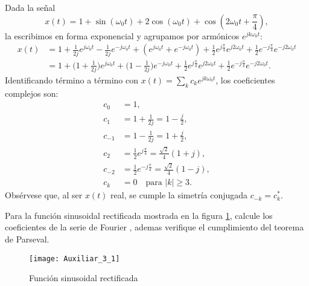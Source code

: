 \documentclass[
  11pt,
  letterpaper,
   addpoints,
   answers
  ]{exam}
\begin{document}
\begin{questions}
\begin{solution}
Dada la señal
\begin{equation}
x(t)=1+\sin(\omega_0 t)+2\cos(\omega_0 t)+\cos\!\left(2\omega_0 t+\frac{\pi}{4}\right),
\end{equation}
la escribimos en forma exponencial y agrupamos por armónicos \(e^{jk\omega_0 t}\):
\begin{align}
x(t)
&= 1
+ \frac{1}{2j}e^{j\omega_0 t}-\frac{1}{2j}e^{-j\omega_0 t}
+ \left(e^{j\omega_0 t}+e^{-j\omega_0 t}\right)
+ \frac{1}{2}e^{j\frac{\pi}{4}}e^{j2\omega_0 t}
+ \frac{1}{2}e^{-j\frac{\pi}{4}}e^{-j2\omega_0 t} \\
&= 1
+ \Big(1+\tfrac{1}{2j}\Big)e^{j\omega_0 t}
+ \Big(1-\tfrac{1}{2j}\Big)e^{-j\omega_0 t}
+ \frac{1}{2}e^{j\frac{\pi}{4}}e^{j2\omega_0 t}
+ \frac{1}{2}e^{-j\frac{\pi}{4}}e^{-j2\omega_0 t}.
\end{align}
Identificando término a término con \(x(t)=\sum_k c_k e^{jk\omega_0 t}\), los coeficientes complejos son:
\begin{align}
c_0 &= 1, \\
c_{1} &= 1+\frac{1}{2j}=1-\frac{j}{2}, \\
c_{-1} &= 1-\frac{1}{2j}=1+\frac{j}{2}, \\
c_{2} &= \frac{1}{2}e^{j\frac{\pi}{4}}=\frac{\sqrt{2}}{4}(1+j), \\
c_{-2} &= \frac{1}{2}e^{-j\frac{\pi}{4}}=\frac{\sqrt{2}}{4}(1-j), \\
c_k &= 0 \quad \text{para } |k|\ge 3.
\end{align}
Obsérvese que, al ser \(x(t)\) real, se cumple la simetría conjugada \(c_{-k}=c_k^{*}\).


\end{solution}

\question Para la función sinusoidal rectificada mostrada en la figura \ref{fig:aux3_1}, calcule los coeficientes de la serie de Fourier , ademas verifique el cumplimiento del teorema de Parseval.
\begin{figure}[H]
    \centering
    \texttt{[image: Auxiliar\_3\_1]}
    \caption{Función sinusoidal rectificada}
    \label{fig:aux3_1}
\end{figure}
\begin{solution}

\end{solution}
\end{questions}
\end{document}
